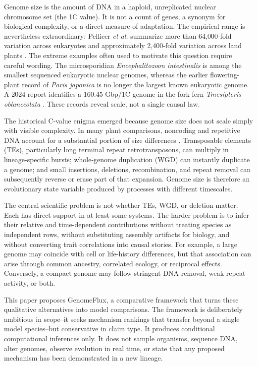 \documentclass[conference]{IEEEtran}
\newcommand{\gf}{GenomeFlux}
\begin{document}
Genome size is the amount of DNA in a haploid, unreplicated nuclear chromosome set (the 1C value). It is not a count of genes, a synonym for biological complexity, or a direct measure of adaptation. The empirical range is nevertheless extraordinary: Pellicer \emph{et al.} summarize more than 64,000-fold variation across eukaryotes and approximately 2,400-fold variation across land plants \cite{pellicer2018}. The extreme examples often used to motivate this question require careful wording. The microsporidian \emph{Encephalitozoon intestinalis} is among the smallest sequenced eukaryotic nuclear genomes, whereas the earlier flowering-plant record of \emph{Paris japonica} is no longer the largest known eukaryotic genome. A 2024 report identifies a 160.45 Gbp/1C genome in the fork fern \emph{Tmesipteris oblanceolata} \cite{fernandez2024}. These records reveal scale, not a single causal law.

The historical C-value enigma emerged because genome size does not scale simply with visible complexity. In many plant comparisons, noncoding and repetitive DNA account for a substantial portion of size differences \cite{pellicer2018,lee2014}. Transposable elements (TEs), particularly long terminal repeat retrotransposons, can multiply in lineage-specific bursts; whole-genome duplication (WGD) can instantly duplicate a genome; and small insertions, deletions, recombination, and repeat removal can subsequently reverse or erase part of that expansion. Genome size is therefore an evolutionary state variable produced by processes with different timescales.

The central scientific problem is not whether TEs, WGD, or deletion matter. Each has direct support in at least some systems. The harder problem is to infer their relative and time-dependent contributions without treating species as independent rows, without substituting assembly artifacts for biology, and without converting trait correlations into causal stories. For example, a large genome may coincide with cell or life-history differences, but that association can arise through common ancestry, correlated ecology, or reciprocal effects. Conversely, a compact genome may follow stringent DNA removal, weak repeat activity, or both.

This paper proposes \gf{}, a comparative framework that turns these qualitative alternatives into model comparisons. The framework is deliberately ambitious in scope--it seeks mechanism rankings that transfer beyond a single model species--but conservative in claim type. It produces conditional computational inferences only. It does not sample organisms, sequence DNA, alter genomes, observe evolution in real time, or state that any proposed mechanism has been demonstrated in a new lineage.
\end{document}
